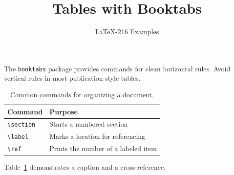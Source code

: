 \documentclass{article}
\title{Tables with Booktabs}
\author{LaTeX-216 Examples}
\date{}
\begin{document}
\maketitle

The \texttt{booktabs} package provides commands for clean horizontal rules.
Avoid vertical rules in most publication-style tables.

\begin{table}[htbp]
  \centering
  \caption{Common commands for organizing a document.}
  \label{tab:commands}
  \begin{tabular}{ll}
    \toprule
    Command & Purpose \\
    \midrule
    \texttt{\textbackslash section} & Starts a numbered section \\
    \texttt{\textbackslash label} & Marks a location for referencing \\
    \texttt{\textbackslash ref} & Prints the number of a labeled item \\
    \bottomrule
  \end{tabular}
\end{table}

Table~\ref{tab:commands} demonstrates a caption and a cross-reference.
\end{document}
